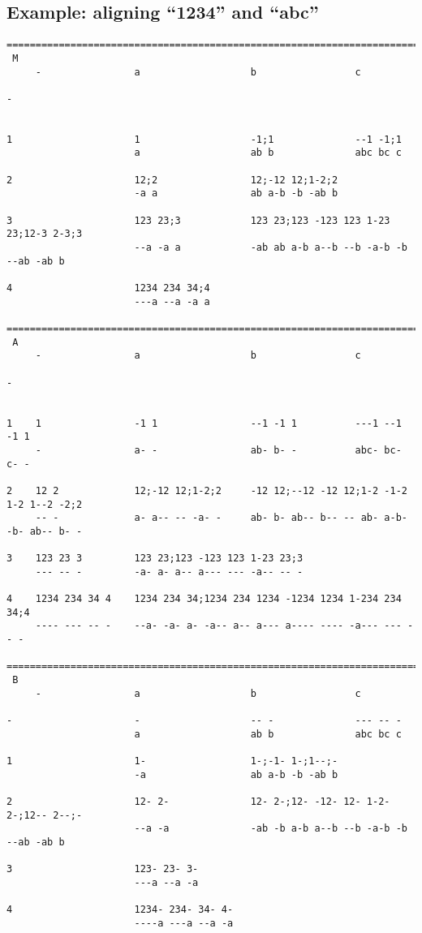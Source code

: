 \documentclass{article}
\begin{document}
\subsection*{Example: aligning ``1234'' and ``abc''}
{\footnotesize
\begin{verbatim}
========================================================================
 M
     -                a                   b                 c

-     
      

1                     1                   -1;1              --1 -1;1
                      a                   ab b              abc bc c

2                     12;2                12;-12 12;1-2;2
                      -a a                ab a-b -b -ab b

3                     123 23;3            123 23;123 -123 123 1-23 23;12-3 2-3;3
                      --a -a a            -ab ab a-b a--b --b -a-b -b --ab -ab b

4                     1234 234 34;4
                      ---a --a -a a

========================================================================
 A
     -                a                   b                 c

-    
     

1    1                -1 1                --1 -1 1          ---1 --1 -1 1
     -                a- -                ab- b- -          abc- bc- c- -

2    12 2             12;-12 12;1-2;2     -12 12;--12 -12 12;1-2 -1-2 1-2 1--2 -2;2
     -- -             a- a-- -- -a- -     ab- b- ab-- b-- -- ab- a-b- -b- ab-- b- -

3    123 23 3         123 23;123 -123 123 1-23 23;3
     --- -- -         -a- a- a-- a--- --- -a-- -- -

4    1234 234 34 4    1234 234 34;1234 234 1234 -1234 1234 1-234 234 34;4
     ---- --- -- -    --a- -a- a- -a-- a-- a--- a---- ---- -a--- --- -- -

========================================================================
 B
     -                a                   b                 c

-                     -                   -- -              --- -- -
                      a                   ab b              abc bc c

1                     1-                  1-;-1- 1-;1--;-
                      -a                  ab a-b -b -ab b

2                     12- 2-              12- 2-;12- -12- 12- 1-2- 2-;12-- 2--;-
                      --a -a              -ab -b a-b a--b --b -a-b -b --ab -ab b

3                     123- 23- 3-
                      ---a --a -a 

4                     1234- 234- 34- 4-
                      ----a ---a --a -a
\end{verbatim}
}
\end{document}
